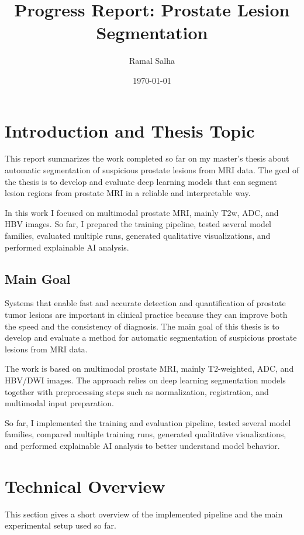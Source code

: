 \documentclass[11pt,a4paper]{article}
\title{Progress Report: Prostate Lesion Segmentation}
\author{Ramal Salha}
\date{\today}
\begin{document}
\maketitle
\tableofcontents
\newpage

\section{Introduction and Thesis Topic}

This report summarizes the work completed so far on my master's thesis about automatic segmentation of suspicious prostate lesions from MRI data. The goal of the thesis is to develop and evaluate deep learning models that can segment lesion regions from prostate MRI in a reliable and interpretable way.

In this work I focused on multimodal prostate MRI, mainly T2w, ADC, and HBV images. So far, I prepared the training pipeline, tested several model families, evaluated multiple runs, generated qualitative visualizations, and performed explainable AI analysis.

\subsection{Main Goal}

Systems that enable fast and accurate detection and quantification of prostate tumor lesions are important in clinical practice because they can improve both the speed and the consistency of diagnosis. The main goal of this thesis is to develop and evaluate a method for automatic segmentation of suspicious prostate lesions from MRI data.

The work is based on multimodal prostate MRI, mainly T2-weighted, ADC, and HBV/DWI images. The approach relies on deep learning segmentation models together with preprocessing steps such as normalization, registration, and multimodal input preparation.

So far, I implemented the training and evaluation pipeline, tested several model families, compared multiple training runs, generated qualitative visualizations, and performed explainable AI analysis to better understand model behavior.

\section{Technical Overview}

This section gives a short overview of the implemented pipeline and the main experimental setup used so far.
\end{document}
